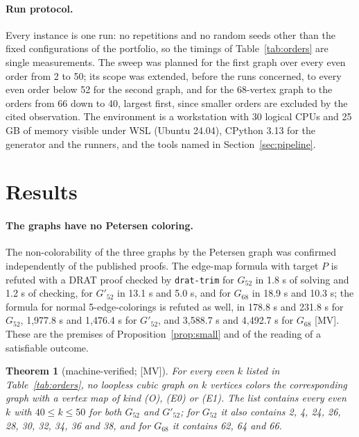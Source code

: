 \documentclass[11pt]{article}
\newtheorem{theorem}{Theorem}[section]
\theoremstyle{definition}
\theoremstyle{remark}
\newcommand{\PG}{P}
\newcommand{\Ga}{G_{52}}
\newcommand{\Gb}{G'_{52}}
\newcommand{\Gsix}{G_{68}}
\newcommand{\evMV}{\textnormal{[MV]}}
\begin{document}
\paragraph{Run protocol.} Every instance is one run: no repetitions and no random seeds other than the fixed configurations of the portfolio, so the timings of Table~\ref{tab:orders} are single measurements. The sweep was planned for the first graph over every even order from 2 to 50; its scope was extended, before the runs concerned, to every even order below 52 for the second graph, and for the 68-vertex graph to the orders from 66 down to 40, largest first, since smaller orders are excluded by the cited observation.
The environment is a workstation with 30 logical CPUs and 25 GB of memory visible under WSL (Ubuntu 24.04), CPython 3.13 for the generator and the runners, and the tools named in Section~\ref{sec:pipeline}.

\section{Results}\label{sec:results}

\paragraph{The graphs have no Petersen coloring.} The non-colorability of the three graphs by the Petersen graph was confirmed independently of the published proofs. The edge-map formula with target $\PG$ is refuted with a DRAT proof checked by \texttt{drat-trim} for
$\Ga$ in 1.8 s of solving and 1.2 s of checking, for $\Gb$ in 13.1 s and 5.0 s, and for $\Gsix$ in 18.9 s and 10.3 s; the formula for normal 5-edge-colorings is refuted as well, in 178.8 s and 231.8 s for $\Ga$, 1{,}977.8 s and 1{,}476.4 s for $\Gb$, and 3{,}588.7 s and 4{,}492.7 s for $\Gsix$ \evMV{}.
These are the premises of Proposition~\ref{prop:small} and of the reading of a satisfiable outcome.

\begin{theorem}[machine-verified; \evMV]\label{thm:orders}
For every even $k$ listed in Table~\ref{tab:orders}, no loopless cubic graph on $k$ vertices colors
the corresponding graph with a vertex map of kind \textup{(O)}, \textup{(E0)} or \textup{(E1)}.
The list contains every even $k$ with $40 \le k \le 50$ for both $\Ga$ and $\Gb$; for $\Ga$ it
also contains 2, 4, 24, 26, 28, 30, 32, 34, 36 and 38, and for $\Gsix$ it contains 62, 64 and 66.
\end{theorem}
\end{document}
